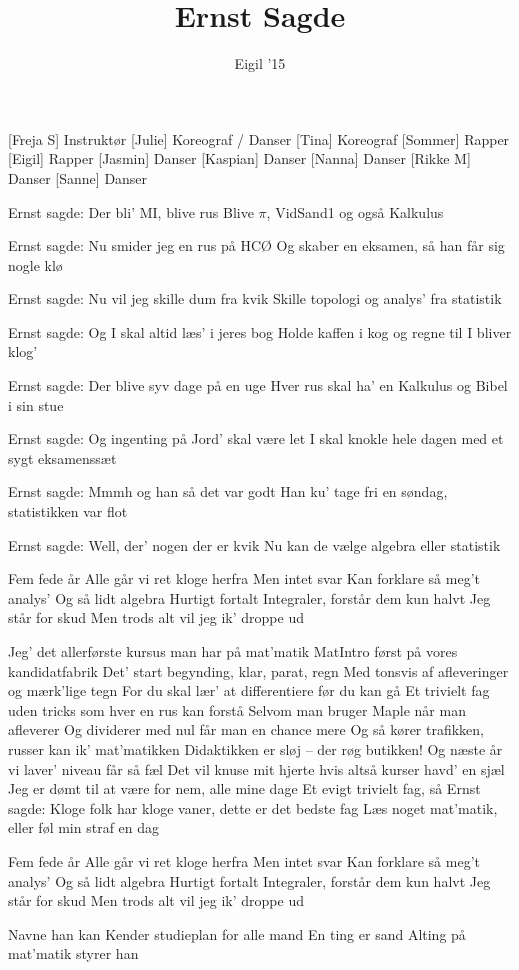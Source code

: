 \documentclass[a4paper,11pt]{article}
\title{Ernst Sagde}
\author{Eigil '15}
\begin{document}
\maketitle

\begin{roles}
[Freja S] Instruktør
[Julie] Koreograf / Danser
[Tina] Koreograf
[Sommer] Rapper
[Eigil] Rapper
[Jasmin] Danser
[Kaspian] Danser
[Nanna] Danser
[Rikke M] Danser
[Sanne] Danser
\end{roles}

\begin{song}
 Ernst sagde:
Der bli' MI, blive rus
Blive $\pi$, VidSand1 og også Kalkulus

 Ernst sagde:
Nu smider jeg en rus på HCØ
Og skaber en eksamen, så han får sig nogle klø

 Ernst sagde:
Nu vil jeg skille dum fra kvik
Skille topologi og analys' fra statistik

 Ernst sagde:
Og I skal altid læs' i jeres bog
Holde kaffen i kog og regne til I bliver klog'

 Ernst sagde:
Der blive syv dage på en uge
Hver rus skal ha' en Kalkulus og Bibel i sin stue

 Ernst sagde:
Og ingenting på Jord' skal være let
I skal knokle hele dagen med et sygt eksamenssæt

 Ernst sagde:
Mmmh og han så det var godt
Han ku' tage fri en søndag, statistikken var flot

 Ernst sagde:
Well, der' nogen der er kvik
Nu kan de vælge algebra eller statistik

 Fem fede år
Alle går vi ret kloge herfra
Men intet svar
Kan forklare så meg't analys'
Og så lidt algebra
Hurtigt fortalt
Integraler, forstår dem kun halvt
Jeg står for skud
Men trods alt vil jeg ik' droppe ud

 Jeg' det allerførste kursus man har på mat'matik
MatIntro først på vores kandidatfabrik
Det' start begynding, klar, parat, regn
Med tonsvis af afleveringer og mærk'lige tegn
For du skal lær' at differentiere før du kan gå
Et trivielt fag uden tricks som hver en rus kan forstå
Selvom man bruger Maple når man afleverer
Og dividerer med nul får man en chance mere
Og så kører trafikken, russer kan ik' mat'matikken
Didaktikken er sløj -- der røg butikken!
Og næste år vi laver' niveau får så fæl
Det vil knuse mit hjerte hvis altså kurser havd' en sjæl
Jeg er dømt til at være for nem, alle mine dage
Et evigt trivielt fag, så Ernst sagde:
Kloge folk har kloge vaner, dette er det bedste fag
Læs noget mat'matik, eller føl min straf en dag

 Fem fede år
Alle går vi ret kloge herfra
Men intet svar
Kan forklare så meg't analys'
Og så lidt algebra
Hurtigt fortalt
Integraler, forstår dem kun halvt
Jeg står for skud
Men trods alt vil jeg ik' droppe ud

 Navne han kan
Kender studieplan for alle mand
En ting er sand
Alting på mat'matik styrer han
\end{song}
\end{document}
